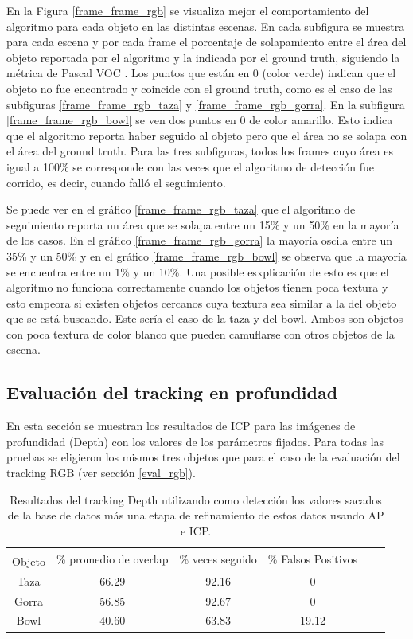 En la Figura \ref{frame_frame_rgb} se visualiza mejor el comportamiento del algoritmo para cada objeto en las distintas escenas. En cada subfigura se muestra para cada escena y por cada frame el porcentaje de solapamiento entre el área del objeto reportada por el algoritmo y la indicada por el ground truth, siguiendo la métrica de Pascal VOC \cite{everinghampascal}.  Los puntos que están en 0 (color verde) indican que el objeto no fue encontrado y coincide con el ground truth, como es el caso de las subfiguras \ref{frame_frame_rgb_taza} y \ref{frame_frame_rgb_gorra}. En la subfigura \ref{frame_frame_rgb_bowl} se ven dos puntos en 0 de color amarillo. Esto indica que el algoritmo reporta haber seguido al objeto pero que el área no se solapa con el área del ground truth. Para las tres subfiguras, todos los frames cuyo área es igual a 100\% se corresponde con las veces que el algoritmo de detección fue corrido, es decir, cuando falló el seguimiento.

Se puede ver en el gráfico \ref{frame_frame_rgb_taza} que el algoritmo de seguimiento reporta un área que se solapa entre un 15\% y un 50\% en la mayoría de los casos. En el gráfico \ref{frame_frame_rgb_gorra} la mayoría oscila entre un 35\% y un 50\% y en el gráfico \ref{frame_frame_rgb_bowl} se observa que la mayoría se encuentra entre un 1\% y un 10\%. Una posible esxplicación de esto es que el algoritmo no funciona correctamente cuando los objetos tienen poca textura y esto empeora si existen objetos cercanos cuya textura sea similar a la del objeto que se está buscando. Este sería el caso de la taza y del bowl. Ambos son objetos con poca textura de color blanco que pueden camuflarse con otros objetos de la escena.

\subsection{Evaluación del tracking en profundidad}
En esta sección se muestran los resultados de ICP para las imágenes de profundidad (Depth) con los valores de los parámetros fijados. Para todas las pruebas se eligieron los mismos tres objetos que para el caso de la evaluación del tracking RGB (ver sección \ref{eval_rgb}).

\begin{table}[h]
    \begin{tabular}{|c|c|c|c|c|c|}
    \hline
    & \multirow{2}{2.4cm}{\% promedio de overlap} & \multirow{2}{2cm}{\% veces seguido} & \multirow{2}{1.6cm}{\% Falsos Positivos}\\
	Objeto & & &\\
    \hline
    Taza   & 66.29      & 92.16             & 0     \\
    \hline
    Gorra  & 56.85      & 92.67             & 0     \\
    \hline
    Bowl   & 40.60      & 63.83             & 19.12 \\
    \hline
    \end{tabular}
\caption{Resultados del tracking Depth utilizando como detección los valores sacados de la base de datos más una etapa de refinamiento de estos datos usando AP e ICP.}
\label{tabla_d}
\end{table}

